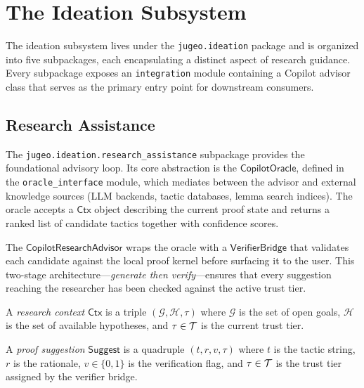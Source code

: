\documentclass[11pt]{article}
\newcommand{\Suggest}{\mathsf{Suggest}}
\newcommand{\Context}{\mathsf{Ctx}}
\begin{document}
\section{The Ideation Subsystem}\label{sec:ideation}

The ideation subsystem lives under the \texttt{jugeo.ideation}
package and is organized into five subpackages, each encapsulating
a distinct aspect of research guidance.  Every subpackage exposes
an \texttt{integration} module containing a Copilot advisor class
that serves as the primary entry point for downstream consumers.

\subsection{Research Assistance}\label{sec:ideation-research}

The \texttt{jugeo.ideation.research\_assistance} subpackage
provides the foundational advisory loop.  Its core abstraction is
the $\mathsf{CopilotOracle}$, defined in the
\texttt{oracle\_interface} module, which mediates between the
advisor and external knowledge sources (LLM backends, tactic
databases, lemma search indices).  The oracle accepts a
$\Context$ object describing the current proof state and returns
a ranked list of candidate tactics together with confidence
scores.

The $\mathsf{CopilotResearchAdvisor}$ wraps the oracle with a
$\mathsf{VerifierBridge}$ that validates each candidate against
the local proof kernel before surfacing it to the user.  This
two-stage architecture—\emph{generate then verify}—ensures that
every suggestion reaching the researcher has been checked against
the active trust tier.

\begin{definition}\label{def:research-context}
A \emph{research context} $\Context$ is a triple
$(\mathcal{G}, \mathcal{H}, \tau)$ where $\mathcal{G}$ is the
set of open goals, $\mathcal{H}$ is the set of available
hypotheses, and $\tau \in \mathcal{T}$ is the current trust tier.
\end{definition}

\begin{definition}\label{def:proof-suggestion}
A \emph{proof suggestion} $\Suggest$ is a quadruple
$(t, r, v, \tau)$ where $t$ is the tactic string, $r$ is the
rationale, $v \in \{0,1\}$ is the verification flag, and
$\tau \in \mathcal{T}$ is the trust tier assigned by the verifier
bridge.
\end{definition}
\end{document}
